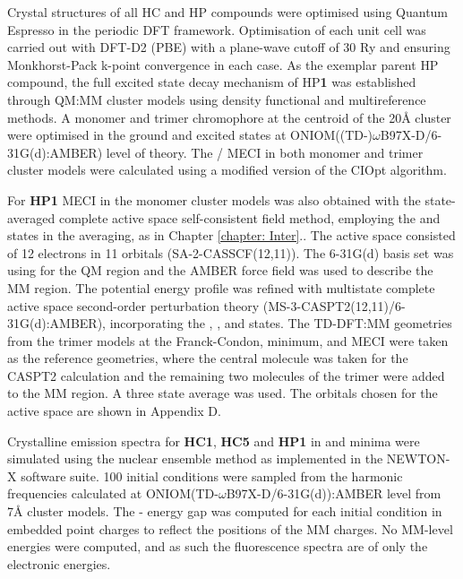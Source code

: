Crystal structures of all \ac{HC} and \ac{HP} compounds were optimised using Quantum Espresso in the periodic DFT framework.\cite{QE-2009} Optimisation of each unit cell was carried out with DFT-D2 (PBE) with a plane-wave cutoff of 30 Ry and ensuring Monkhorst-Pack k-point convergence in each case. As the exemplar parent \ac{HP} compound, the full excited state decay mechanism of \ac{HP}\textbf{1} was established through QM:MM cluster models using density functional and multireference methods. A monomer and trimer chromophore at the centroid of the 20{\AA} cluster were optimised in the ground and excited states at ONIOM((TD-)$\omega$B97X-D/6-31G(d):AMBER) level of theory. The \sone/\szero{} MECI in both monomer and trimer cluster models were calculated using a modified version of the CIOpt algorithm.\cite{Levine2008} 

For \textbf{HP1} MECI in the monomer cluster models was also obtained with the state-averaged complete active space self-consistent field method, employing the \szero{} and \sone{} states in the averaging, as in Chapter \ref{chapter: Inter}.. The active space consisted of 12 electrons in 11 orbitals (SA-2-CASSCF(12,11)). The 6-31G(d) basis set was using for the QM region and the AMBER force field was used to describe the MM region. The potential energy profile was refined with multistate complete active space second-order perturbation theory (MS-3-CASPT2(12,11)/6-31G(d):AMBER), incorporating the \szero{}, \sone{}, and \stwo{} states. The TD-DFT:MM geometries from the trimer models at the Franck-Condon, \sone{} minimum, and MECI were taken as the reference geometries, where the central molecule was taken for the CASPT2 calculation and the remaining two molecules of the trimer were added to the MM region.  A three state average was used. The orbitals chosen for the active space are shown in Appendix D. 

Crystalline emission spectra for \textbf{HC1}, \textbf{HC5} and \textbf{HP1} in \Estar{} and \Kstar{} minima were simulated using the nuclear ensemble method as implemented in the NEWTON-X software suite.\cite{Barbatti2014} 100 initial conditions were sampled from the harmonic frequencies calculated at ONIOM(TD-$\omega$B97X-D/6-31G(d)):AMBER level from 7\AA{} cluster models. The \sone{}-\szero{} energy gap was computed for each initial condition in embedded point charges to reflect the positions of the MM charges. No MM-level energies were computed, and as such the fluorescence spectra are of only the electronic energies.

